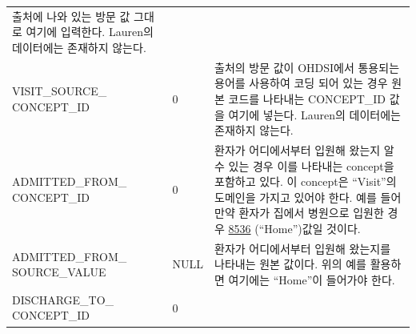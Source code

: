 \documentclass[11pt]{book}
\theoremstyle{definition}
\theoremstyle{definition}
\theoremstyle{definition}
\theoremstyle{remark}
\begin{document}
\begin{longtable}[]{@{}lll@{}}
\begin{minipage}[t]{0.48\columnwidth}
출처에 나와 있는 방문 값 그대로 여기에 입력한다. Lauren의 데이터에는
존재하지 않는다.\strut
\end{minipage}\tabularnewline
\begin{minipage}[t]{0.28\columnwidth}\raggedright\strut
VISIT\_SOURCE\_ CONCEPT\_ID\strut
\end{minipage} & \begin{minipage}[t]{0.16\columnwidth}\raggedright\strut
0\strut
\end{minipage} & \begin{minipage}[t]{0.48\columnwidth}\raggedright\strut
출처의 방문 값이 OHDSI에서 통용되는 용어를 사용하여 코딩 되어 있는 경우
원본 코드를 나타내는 CONCEPT\_ID 값을 여기에 넣는다. Lauren의 데이터에는
존재하지 않는다.\strut
\end{minipage}\tabularnewline
\begin{minipage}[t]{0.28\columnwidth}\raggedright\strut
ADMITTED\_FROM\_ CONCEPT\_ID\strut
\end{minipage} & \begin{minipage}[t]{0.16\columnwidth}\raggedright\strut
0\strut
\end{minipage} & \begin{minipage}[t]{0.48\columnwidth}\raggedright\strut
환자가 어디에서부터 입원해 왔는지 알 수 있는 경우 이를 나타내는
concept을 포함하고 있다. 이 concept은 ``Visit''의 도메인을 가지고 있어야
한다. 예를 들어 만약 환자가 집에서 병원으로 입원한 경우
\href{http://athena.ohdsi.org/search-terms/terms/8536}{8536}
(``Home'')값일 것이다.\strut
\end{minipage}\tabularnewline
\begin{minipage}[t]{0.28\columnwidth}\raggedright\strut
ADMITTED\_FROM\_ SOURCE\_VALUE\strut
\end{minipage} & \begin{minipage}[t]{0.16\columnwidth}\raggedright\strut
NULL\strut
\end{minipage} & \begin{minipage}[t]{0.48\columnwidth}\raggedright\strut
환자가 어디에서부터 입원해 왔는지를 나타내는 원본 값이다. 위의 예를
활용하면 여기에는 ``Home''이 들어가야 한다.\strut
\end{minipage}\tabularnewline
\begin{minipage}[t]{0.28\columnwidth}\raggedright\strut
DISCHARGE\_TO\_ CONCEPT\_ID\strut
\end{minipage} & \begin{minipage}[t]{0.16\columnwidth}\raggedright\strut
0\strut
\end{minipage} & \begin{minipage}[t]{0.48\columnwidth}\raggedright\strut

\end{minipage}
\end{longtable}
\end{document}
